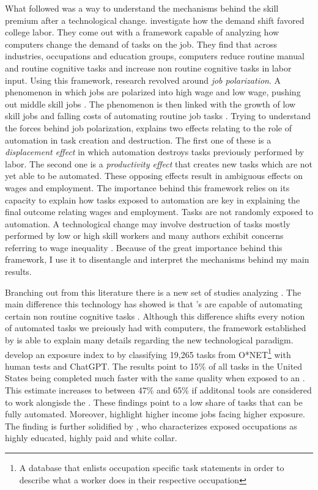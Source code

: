 What followed was a way to understand the mechanisms behind the skill premium after a technological change. \cite{murnane} investigate how the demand shift favored college labor. They come out with a framework capable of analyzing how computers change the demand of tasks on the job. They find that across industries, occupations and education groups, computers reduce routine manual and routine cognitive tasks and increase non routine cognitive tasks in labor input. Using this framework, research revolved around \textit{job polarization}. A phenomenon in which jobs are polarized into high wage and low wage, pushing out middle skill jobs  \citep{goos,autorkatzkearney}. The phenomenon is then linked with the growth of low skill jobs and falling costs of automating routine job tasks \citep{goos2014,autor2014}. Trying to understand the forces behind job polarization, \cite{acemoglu2018} explains two effects relating to the role of automation in task creation and destruction. The first one of these is a \textit{displacement effect} in which automation destroys tasks previously performed by labor. The second one is a \textit{productivity effect} that creates new tasks which are not yet able to be automated. These opposing effects result in ambiguous effects on wages and employment. The importance behind this framework relies on its capacity to explain how tasks exposed to automation are key in explaining the final outcome relating wages and employment. Tasks are not randomly exposed to automation. A technological change may involve destruction of tasks mostly performed by low or high skill workers and many authors exhibit concerns referring to wage inequality \citep{murnane,goldin2007,goos,goos2014,autor2014,brynjolfsson2014second,stiglitz2017artificial}. Because of the great importance behind this framework, I use it to disentangle and interpret the mechanisms behind my main results.

Branching out from this literature there is a new set of studies analyzing . The main difference this technology has showed is that 's are capable of automating certain non routine cognitive tasks \citep{eloundou2023gptsgptsearlylook}. Although this difference shifts every notion of automated tasks we preiously had with computers, the framework established by \cite{acemoglu2018} is able to explain many details regarding the new technological paradigm. \cite{eloundou2023gptsgptsearlylook} develop an exposure index to  by classifying 19,265 tasks from O*NET\footnote{A database that enlists occupation specific task statements in order to describe what a worker does in their respective occupation} with human tests and ChatGPT. The results point to 15\% of all tasks in the United States being completed much faster with the same quality when exposed to an . This estimate increases to between 47\% and 65\% if additonal tools are considered to work alongisde the . These findings point to a low share of tasks that can be fully automated. Moreover, \cite{eloundou2023gptsgptsearlylook} highlight higher income jobs facing higher exposure. The finding is further solidified by \cite{Felten2023OccupationalHI}, who characterizes exposed occupations as highly educated, highly paid and white collar.

